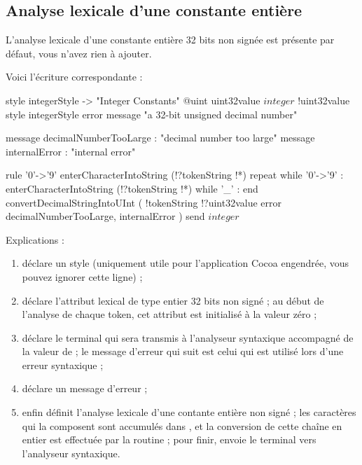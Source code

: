 \subsection{Analyse lexicale d'une constante entière}

L’analyse lexicale d’une constante entière 32 bits non signée est présente par défaut, vous n’avez rien à ajouter.

Voici l'écriture correspondante :
\begin{galgascode}
style integerStyle -> "Integer Constants"
@uint uint32value
$integer$ !uint32value style integerStyle
               error message "a 32-bit unsigned decimal number"

message decimalNumberTooLarge : "decimal number too large"
message internalError : "internal error"

rule '0'->'9' {
  enterCharacterIntoString (!?tokenString !*)
  repeat
  while '0'->'9' :
    enterCharacterIntoString (!?tokenString !*)
  while '_' :
  end
  convertDecimalStringIntoUInt (
    !tokenString
    !?uint32value
    error decimalNumberTooLarge, internalError
  )
  send $integer$
}
\end{galgascode}


Explications :
\begin{enumerate}
  \item {} déclare un style (uniquement utile pour l’application Cocoa engendrée, vous pouvez ignorer cette ligne) ;
  \item {} déclare l’attribut lexical  de type entier 32 bits non signé ; au début de l’analyse de chaque token, cet attribut est initialisé à la valeur zéro ;
  \item {} déclare le terminal  qui sera transmis à l’analyseur syntaxique accompagné de la valeur de  ;  le message d’erreur qui suit est celui qui est utilisé lors d’une erreur syntaxique ;
  \item {} déclare un message d’erreur ;
  \item enfin  définit l’analyse lexicale d’une contante entière non signé ; les caractères qui la composent sont accumulés dans , et la conversion de cette chaîne en entier est effectuée par la routine  ; pour finir,  envoie le terminal vers l’analyseur syntaxique.
\end{enumerate}

